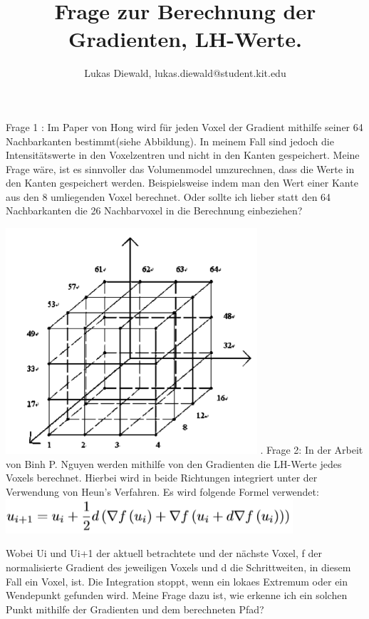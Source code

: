 \documentclass{article}
\title{
Frage zur Berechnung der Gradienten, LH-Werte.
}
\author{Lukas Diewald, lukas.diewald@student.kit.edu}
\begin{document}
Frage 1 :
\newline
Im Paper von Hong \cite{hong2003method} wird für jeden Voxel der Gradient mithilfe seiner 64 Nachbarkanten bestimmt(siehe Abbildung).
In meinem Fall sind jedoch die Intensitätswerte in den Voxelzentren und nicht in den Kanten gespeichert.
Meine Frage wäre, ist es sinnvoller das Volumenmodel umzurechnen, dass die Werte in den Kanten gespeichert werden.
Beispielsweise indem man den Wert einer Kante aus den 8 umliegenden Voxel berechnet.
Oder sollte ich lieber statt den 64 Nachbarkanten die 26 Nachbarvoxel in die Berechnung einbeziehen?

\includegraphics[width=0.7\textwidth]{VoxelEdges.PNG}
.
\newline
Frage 2:
\newline
In der Arbeit von Binh P. Nguyen \cite{nguyen2011automatic} werden mithilfe von den Gradienten die LH-Werte jedes Voxels berechnet. Hierbei wird in beide Richtungen integriert unter der Verwendung von Heun's Verfahren. Es wird folgende Formel verwendet:
\includegraphics[width=0.8\textwidth]{Formula.PNG}

Wobei Ui und Ui+1 der aktuell betrachtete und der nächste Voxel, f der normalisierte Gradient des jeweiligen Voxels und d die Schrittweiten, in diesem Fall ein Voxel, ist.
Die Integration stoppt, wenn ein lokaes Extremum oder ein Wendepunkt gefunden wird.
Meine Frage dazu ist, wie erkenne ich ein solchen Punkt mithilfe der Gradienten und dem berechneten Pfad?

{}

\end{document}
